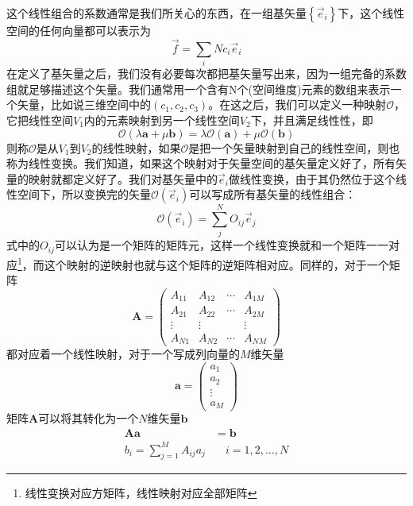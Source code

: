 \documentclass[12pt,a4paper,openany,twoside]{book}
\numberwithin{equation}{section}
\begin{document}
    这个线性组合的系数通常是我们所关心的东西，在一组基矢量$\left\{\vec{e}_i\right\}$下，这个线性空间的任何向量都可以表示为
    \begin{equation}
      \vec{f}=\sum_i{N}c_i\vec{e}_i
    \end{equation}
    在定义了基矢量之后，我们没有必要每次都把基矢量写出来，因为一组完备的系数组就足够描述这个矢量。我们通常用一个含有N个(空间维度)元素的数组来表示一个矢量，比如说三维空间中的$(c_1,c_2,c_3)$。在这之后，我们可以定义一种映射$\mathcal{O}$，它把线性空间$V_1$内的元素映射到另一个线性空间$V_2$下，并且满足线性性，即
    \begin{equation}
      \mathcal{O}(\lambda\mathbf{a}+\mu\mathbf{b})=\lambda\mathcal{O}(\mathbf{a})+ \mu\mathcal{O}(\mathbf{b})
    \end{equation}
    则称$\mathcal{O}$是从$V_1$到$V_2$的线性映射，如果$\mathcal{O}$是把一个矢量映射到自己的线性空间，则也称为线性变换。我们知道，如果这个映射对于矢量空间的基矢量定义好了，所有矢量的映射就都定义好了。我们对基矢量中的$\vec{e}_i$做线性变换，由于其仍然位于这个线性空间下，所以变换完的矢量$\mathcal{O}(\vec{e}_i)$可以写成所有基矢量的线性组合：
    \begin{equation}
      \mathcal{O}(\vec{e}_i)=\sum_j^N  O_{ij}  \vec{e}_j 
    \end{equation}
    式中的$O_{ij}$可以认为是一个矩阵的矩阵元，这样一个线性变换就和一个矩阵一一对应\footnote{线性变换对应方矩阵，线性映射对应全部矩阵}，而这个映射的逆映射也就与这个矩阵的逆矩阵相对应。同样的，对于一个矩阵
    \begin{equation}
      \mathbf{A}=\left( \begin{array}{cccc}{A_{11}} & {A_{12}} & {\cdots} & {A_{1 M}} \\ {A_{21}} & {A_{22}} & {\cdots} & {A_{2 M}} \\ {\vdots} & {\vdots} & { } & {\vdots} \\ {A_{N 1}} & {A_{N 2}} & {\cdots} & {A_{N M}}\end{array}\right)
    \end{equation}
    都对应着一个线性映射，对于一个写成列向量的$M$维矢量
    \begin{equation}
      \mathbf{a}=\left( \begin{array}{c}{a_{1}} \\ {a_{2}} \\ {\vdots} \\ {a_{M}}\end{array}\right)
      \label{column vector}
    \end{equation}
    矩阵$\mathbf{A}$可以将其转化为一个$N$维矢量$\mathbf{b}$
    \begin{equation}
      \begin{aligned}
        \mathbf{A} \mathbf{a}&=\mathbf{b}\\
        b_{i}=\sum_{j=1}^{M} A_{i j} a_{j} &\quad i=1,2, \ldots, N
      \end{aligned}
      \label{linear transformation}
    \end{equation}
\end{document}
